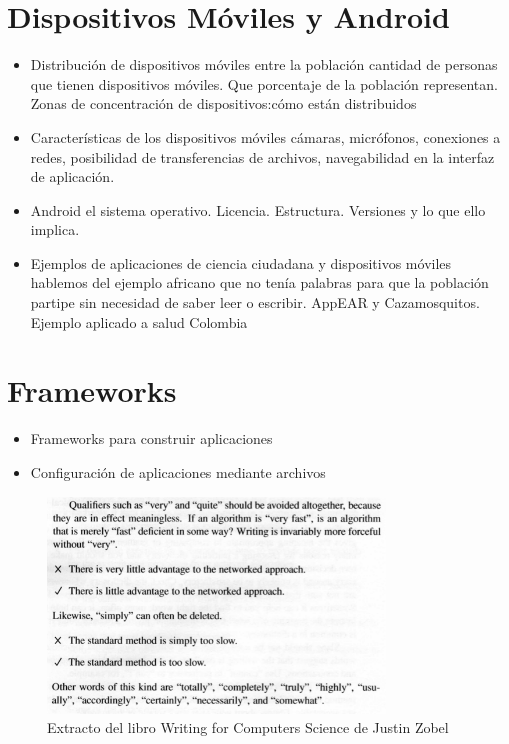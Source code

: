 \section{ Dispositivos Móviles y Android }
\begin{itemize}
	\item Distribución de dispositivos móviles entre la población
	cantidad de personas que tienen dispositivos móviles. Que porcentaje de la población representan. Zonas de concentración de dispositivos:cómo están distribuidos
	\item Características de los dispositivos móviles
	cámaras, micrófonos, conexiones a redes, posibilidad de transferencias de archivos, navegabilidad en la interfaz de aplicación. 
    \item Android 
    el sistema operativo. Licencia. Estructura. Versiones y lo que ello implica.
    \item Ejemplos de aplicaciones de ciencia ciudadana y dispositivos móviles 
    hablemos del ejemplo africano que no tenía palabras para que la población partipe sin necesidad de saber leer o escribir. AppEAR y Cazamosquitos. Ejemplo aplicado a salud Colombia
\end{itemize}

\section{ Frameworks }

\begin{itemize}
	\item Frameworks para construir aplicaciones
    \item Configuración de aplicaciones mediante archivos
\end{itemize}

\begin{figure}
\begin{center}
\includegraphics[width=0.8\textwidth]{00-introduccion/zobel-page-46}
\caption{Extracto del libro Writing for Computers Science de Justin Zobel}
\label{zobel-page-46}
\end{center}
\end{figure}

